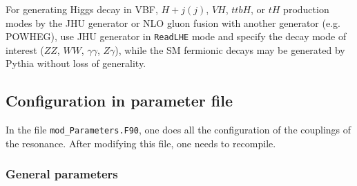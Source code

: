 \documentclass[aps,superscriptaddress,nofootinbib]{revtex4}
\begin{document}
\noindent
For generating Higgs decay in VBF, $H+j(j)$, $VH$, $ttbH$, or $tH$ production
modes by the JHU generator or NLO gluon fusion with another generator (e.g. POWHEG), use JHU generator in \verb|ReadLHE|
mode and specify the decay mode of interest ($ZZ$, $WW$, $\gamma\gamma$, $Z\gamma$), while the SM fermionic decays
may be generated by Pythia without loss of generality.

\subsection{ Configuration in parameter file  }

In the file \verb|mod_Parameters.F90|, one does all the configuration of the couplings of the resonance.
After modifying this file, one needs to recompile.

\subsubsection{ General parameters }
\end{document}
